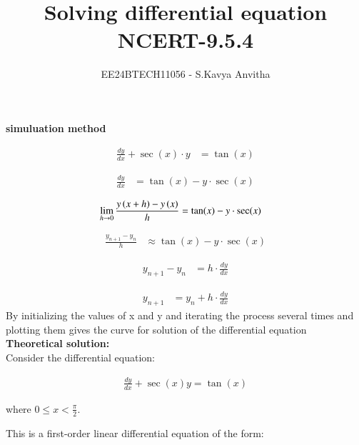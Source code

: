 \documentclass[journal]{IEEEtran}
\begin{document}

\vspace{3cm}

\title{Solving differential equation\\NCERT-9.5.4}
\author{EE24BTECH11056 - S.Kavya Anvitha}
\maketitle
\bigskip

\renewcommand{\thefigure}{\theenumi}
\renewcommand{\thetable}{\theenumi}
\textbf{simuluation method}

\begin{align*}
\frac{dy}{dx} + \sec(x) \cdot y &= \tan(x)
\end{align*}

\begin{align*}
\frac{dy}{dx} &= \tan(x) - y \cdot \sec(x)
\end{align*}

\begin{align*}
\lim_{h \to 0} \frac{y\left(x+h\right) - y\left(x\right)}{h} &= \tan(x) - y \cdot \sec(x)
\end{align*}

\begin{align*}
\frac{y_{n+1} - y_n}{h} &\approx \tan(x) - y \cdot \sec(x)
\end{align*}

\begin{align*}
y_{n+1} - y_n &= h \cdot \frac{dy}{dx}
\end{align*}

\begin{align*}
y_{n+1} &= y_n + h \cdot \frac{dy}{dx}
\end{align*}
By initializing the values of x and y and iterating the process several times 
and plotting them gives the curve for solution of the differential equation\\

\textbf{Theoretical solution:}\\
Consider the differential equation:

\begin{align*}
\frac{dy}{dx} + \sec(x)y = \tan(x)
\end{align*}

where $0 \leq x < \frac{\pi}{2}$.

This is a first-order linear differential equation of the form:
\end{document}
